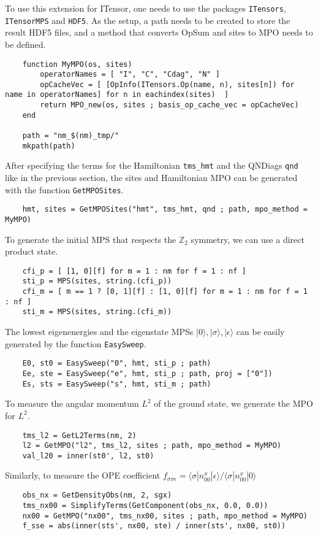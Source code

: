 \documentclass{timesjhep}
\begin{document}
To use this extension for ITensor, one needs to use the packages \lstinline|ITensors|, \lstinline|ITensorMPS| and \lstinline|HDF5|. As the setup, a path needs to be created to store the result HDF5 files, and a method that converts OpSum and sites to MPO needs to be defined.
\begin{lstlisting}
    function MyMPO(os, sites)
        operatorNames = [ "I", "C", "Cdag", "N" ]
        opCacheVec = [ [OpInfo(ITensors.Op(name, n), sites[n]) for name in operatorNames] for n in eachindex(sites)  ]
        return MPO_new(os, sites ; basis_op_cache_vec = opCacheVec)
    end

    path = "nm_$(nm)_tmp/"
    mkpath(path)
\end{lstlisting}
After specifying the terms for the Hamiltonian \lstinline|tms_hmt| and the QNDiags \lstinline|qnd| like in the previous section, the sites and Hamiltonian MPO can be generated with the function \lstinline|GetMPOSites|.
\begin{lstlisting}
    hmt, sites = GetMPOSites("hmt", tms_hmt, qnd ; path, mpo_method = MyMPO)
\end{lstlisting}
To generate the initial MPS that respects the $\mathbb{Z}_2$ symmetry, we can use a direct product state.
\begin{lstlisting}
    cfi_p = [ [1, 0][f] for m = 1 : nm for f = 1 : nf ]
    sti_p = MPS(sites, string.(cfi_p))
    cfi_m = [ m == 1 ? [0, 1][f] : [1, 0][f] for m = 1 : nm for f = 1 : nf ]
    sti_m = MPS(sites, string.(cfi_m))
\end{lstlisting}
The lowest eigenenergies and the eigenstate MPSs $|0\rangle,|\sigma\rangle,|\epsilon\rangle$ can be easily generated by the function \lstinline|EasySweep|.
\begin{lstlisting}
    E0, st0 = EasySweep("0", hmt, sti_p ; path)
    Ee, ste = EasySweep("e", hmt, sti_p ; path, proj = ["0"])
    Es, sts = EasySweep("s", hmt, sti_m ; path)
\end{lstlisting}
To measure the angular momentum $L^2$ of the ground state, we generate the MPO for $L^2$.
\begin{lstlisting}
    tms_l2 = GetL2Terms(nm, 2)
    l2 = GetMPO("l2", tms_l2, sites ; path, mpo_method = MyMPO)
    val_l20 = inner(st0', l2, st0)
\end{lstlisting}
Similarly, to measure the OPE coefficient $f_{\sigma\sigma\epsilon}=\langle \sigma|n^x_{00}|\epsilon\rangle/\langle \sigma|n^x_{00}|0\rangle$
\begin{lstlisting}
    obs_nx = GetDensityObs(nm, 2, sgx)
    tms_nx00 = SimplifyTerms(GetComponent(obs_nx, 0.0, 0.0))
    nx00 = GetMPO("nx00", tms_nx00, sites ; path, mpo_method = MyMPO)
    f_sse = abs(inner(sts', nx00, ste) / inner(sts', nx00, st0))
\end{lstlisting}
\end{document}
